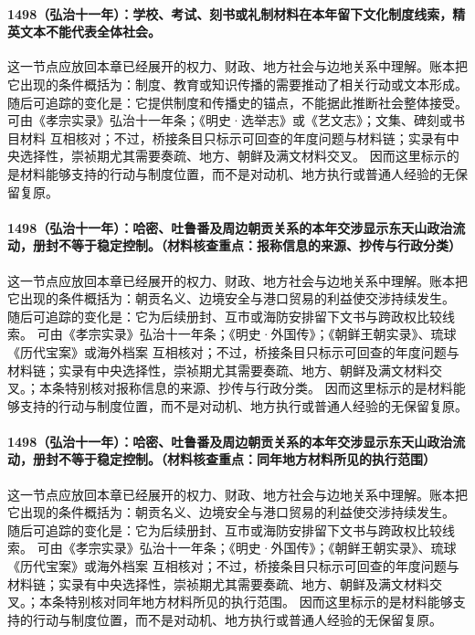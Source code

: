 \paragraph{1498（弘治十一年）：学校、考试、刻书或礼制材料在本年留下文化制度线索，精英文本不能代表全体社会。} 这一节点应放回本章已经展开的权力、财政、地方社会与边地关系中理解。账本把它出现的条件概括为：制度、教育或知识传播的需要推动了相关行动或文本形成。 随后可追踪的变化是：它提供制度和传播史的锚点，不能据此推断社会整体接受。 可由《孝宗实录》弘治十一年条；《明史·选举志》或《艺文志》；文集、碑刻或书目材料 互相核对；不过，桥接条目只标示可回查的年度问题与材料链；实录有中央选择性，崇祯期尤其需要奏疏、地方、朝鲜及满文材料交叉。 因而这里标示的是材料能够支持的行动与制度位置，而不是对动机、地方执行或普通人经验的无保留复原。

\paragraph{1498（弘治十一年）：哈密、吐鲁番及周边朝贡关系的本年交涉显示东天山政治流动，册封不等于稳定控制。（材料核查重点：报称信息的来源、抄传与行政分类）} 这一节点应放回本章已经展开的权力、财政、地方社会与边地关系中理解。账本把它出现的条件概括为：朝贡名义、边境安全与港口贸易的利益使交涉持续发生。 随后可追踪的变化是：它为后续册封、互市或海防安排留下文书与跨政权比较线索。 可由《孝宗实录》弘治十一年条；《明史·外国传》；《朝鲜王朝实录》、琉球《历代宝案》或海外档案 互相核对；不过，桥接条目只标示可回查的年度问题与材料链；实录有中央选择性，崇祯期尤其需要奏疏、地方、朝鲜及满文材料交叉。；本条特别核对报称信息的来源、抄传与行政分类。 因而这里标示的是材料能够支持的行动与制度位置，而不是对动机、地方执行或普通人经验的无保留复原。

\paragraph{1498（弘治十一年）：哈密、吐鲁番及周边朝贡关系的本年交涉显示东天山政治流动，册封不等于稳定控制。（材料核查重点：同年地方材料所见的执行范围）} 这一节点应放回本章已经展开的权力、财政、地方社会与边地关系中理解。账本把它出现的条件概括为：朝贡名义、边境安全与港口贸易的利益使交涉持续发生。 随后可追踪的变化是：它为后续册封、互市或海防安排留下文书与跨政权比较线索。 可由《孝宗实录》弘治十一年条；《明史·外国传》；《朝鲜王朝实录》、琉球《历代宝案》或海外档案 互相核对；不过，桥接条目只标示可回查的年度问题与材料链；实录有中央选择性，崇祯期尤其需要奏疏、地方、朝鲜及满文材料交叉。；本条特别核对同年地方材料所见的执行范围。 因而这里标示的是材料能够支持的行动与制度位置，而不是对动机、地方执行或普通人经验的无保留复原。


